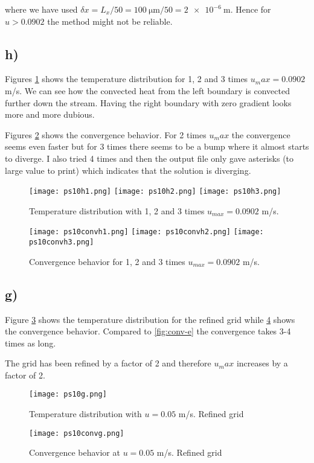\documentclass{article}
\begin{document}
where we have used $\delta x = L_x/50 = \SI{100}{\micro\meter}/50 = \SI{2e-6}{\meter}$. Hence for $u>0.0902$ the method might not be reliable.

\subsection{h)}
Figures \ref{fig:temp-h} shows the temperature distribution for 1, 2 and 3 times $u_max = 0.0902$ m/s. We can see how the convected heat from the left boundary is convected further down the stream. Having the right boundary with zero gradient looks more and more dubious. 

Figures \ref{fig:conv-h} shows the convergence behavior. For 2 times $u_max$ the convergence seems even faster but for 3 times there seems to be a bump where it almost starts to diverge. I also tried 4 times and then the output file only gave asterisks (to large value to print) which indicates that the solution is diverging.

\begin{figure}
\texttt{[image: ps10h1.png]}
\texttt{[image: ps10h2.png]}
\texttt{[image: ps10h3.png]}
\caption{Temperature distribution with 1, 2 and 3 times  $u_{max}=0.0902$ m/s.}
\label{fig:temp-h}
\end{figure}

\begin{figure}
\texttt{[image: ps10convh1.png]}
\texttt{[image: ps10convh2.png]}
\texttt{[image: ps10convh3.png]}
\caption{Convergence behavior for 1, 2 and 3 times  $u_{max}=0.0902$ m/s.}
\label{fig:conv-h}
\end{figure}

\subsection{g)}

Figure \ref{fig:temp-g} shows the temperature distribution for the refined grid while \ref{fig:conv-g} shows the convergence behavior. Compared to \ref{fig:conv-e} the convergence takes 3-4 times as long. 

The grid has been refined by a factor of 2 and therefore $u_max$ increases by a factor of 2.

\begin{figure}
\texttt{[image: ps10g.png]}
\caption{Temperature distribution with $u=0.05$ m/s. Refined grid}
\label{fig:temp-g}
\end{figure}

\begin{figure}
\texttt{[image: ps10convg.png]}
\caption{Convergence behavior at $u=0.05$ m/s. Refined grid}
\label{fig:conv-g}
\end{figure}

\newpage

\newpage

\newpage

\end{document}
